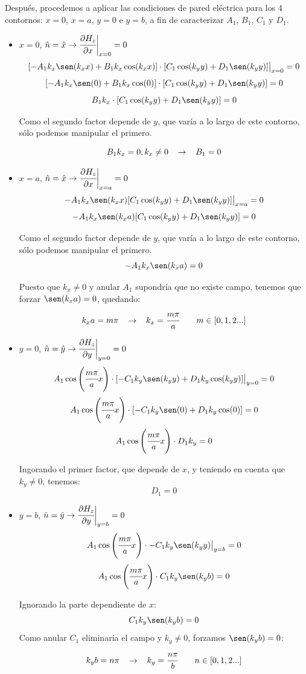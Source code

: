 \documentclass[12pt]{article}
\begin{document}
Despu\'es, procedemos a aplicar las condiciones de pared el\'ectrica para los 4 contornos: $x=0$, $x=a$, $y=0$ e $y=b$, a fin de caracterizar $A_1$, $B_1$, $C_1$ y $D_1$.

\begin{itemize}
	\item $x=0$, $\hat{n} = \hat{x} \rightarrow \cfrac{\partial H_z}{\partial x}\bigg|_{x=0} = 0$
$$[-A_1 k_x \sen(k_xx) + B_1 k_x \cos(k_xx)]\cdot[C_1\cos(k_yy) + D_1\sen(k_yy)]\big|_{x=0} =0$$
$$[-A_1 k_x \sen(0) + B_1 k_x \cos(0)]\cdot[C_1\cos(k_yy) + D_1\sen(k_yy)]=0$$
$$B_1 k_x\cdot[C_1\cos(k_yy) + D_1\sen(k_yy)]=0$$

Como el segundo factor depende de $y$, que var\'ia a lo largo de este contorno, s\'olo podemos manipular el primero.

$$B_1 k_x = 0, k_x \neq 0 \hspace{0.3cm}\rightarrow \hspace{0.3cm} B_1 = 0$$


	\item $x=a$, $\hat{n} = \hat{x} \rightarrow \cfrac{\partial H_z}{\partial x}\bigg|_{x=a} = 0$
$$-A_1 k_x \sen(k_xx)[C_1\cos(k_yy) + D_1\sen(k_yy)]\big|_{x=a} =0$$
$$-A_1 k_x \sen(k_xa)[C_1\cos(k_yy) + D_1\sen(k_yy)] =0$$

Como el segundo factor depende de $y$, que var\'ia a lo largo de este contorno, s\'olo podemos manipular el primero.
$$-A_1 k_x \sen(k_xa) =0$$

Puesto que $k_x \neq 0$ y anular $A_1$ supondr\'ia que no existe campo, tenemos que forzar $\sen(k_xa) =0$, quedando:
$$k_xa = m\pi \hspace{0.3cm}\rightarrow \hspace{0.3cm} k_x=\cfrac{m\pi}{a}\hspace{7mm} m \in [0,1,2...]$$
	\item $y=0$, $\hat{n} = \hat{y} \rightarrow \cfrac{\partial H_z}{\partial y}\bigg|_{y=0} = 0$
$$A_1 \cos\left(\cfrac{m\pi}{a}x\right)\cdot[-C_1k_y\sen(k_yy) + D_1k_y\cos(k_yy)]\big|_{y=0} =0$$
$$A_1 \cos\left(\cfrac{m\pi}{a}x\right)\cdot[-C_1k_y\sen(0) + D_1k_y\cos(0)] =0$$
$$A_1 \cos\left(\cfrac{m\pi}{a}x\right)\cdot D_1k_y =0$$

Ingorando el primer factor, que depende de $x$, y teniendo en cuenta que $k_y \neq 0$, tenemos:
$$D_1=0$$
	\item $y=b$, $\hat{n} = \hat{y} \rightarrow \cfrac{\partial H_z}{\partial y}\bigg|_{y=b} = 0$
$$A_1 \cos\left(\cfrac{m\pi}{a}x\right)\cdot-C_1k_y\sen(k_yy)\big|_{y=b} = 0$$
$$A_1 \cos\left(\cfrac{m\pi}{a}x\right)\cdot C_1k_y\sen(k_yb) = 0$$
	
	Ignorando la parte dependiente de $x$:
$$C_1k_y\sen(k_yb) = 0$$
	Como anular $C_1$ eliminar\'ia el campo y $k_y \neq 0$, forzamos $\sen(k_yb) = 0$:
$$k_yb = n\pi \hspace{0.3cm}\rightarrow \hspace{0.3cm} k_y=\cfrac{n\pi}{b}\hspace{7mm} n \in [0,1,2...]$$

\end{itemize}
\end{document}

